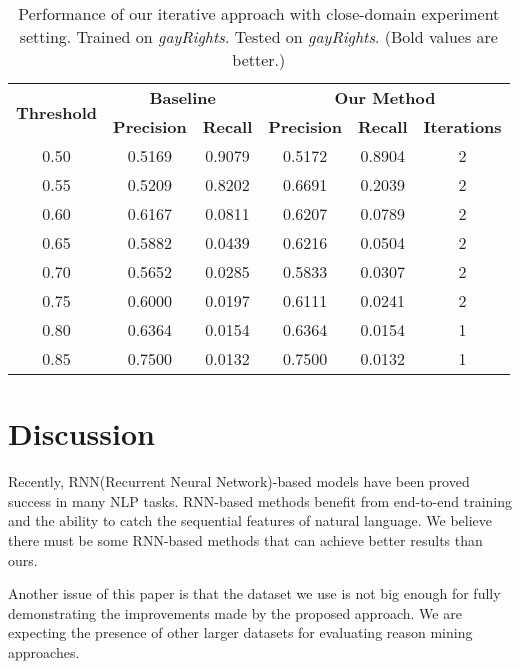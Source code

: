 \documentclass[11pt,a4paper]{article}
\begin{document}
\begin{table*}[h]
\begin{center}
\begin{tabular}{|c||c|c|c|c|c|}
\hline
\multicolumn{1}{|c|}{\multirow{2}{*}{\bf Threshold}} & \multicolumn{2}{c|}{\bf Baseline}  & \multicolumn{3}{c|}{\bf Our Method}    \\ \cline{2-6} 
\multicolumn{1}{|c|}{}   & \multicolumn{1}{l|}{\bf Precision} & \multicolumn{1}{l|}{\bf Recall} & \multicolumn{1}{l|}{\bf Precision} & \multicolumn{1}{c|}{\bf Recall} & \multicolumn{1}{l|}{\bf Iterations} \\ \hline
 \hline
0.50 & 0.5169 & 0.9079 & 0.5172 & 0.8904 & 2 \\
0.55 & 0.5209 & 0.8202 & 0.6691 & 0.2039 & 2 \\
0.60 & 0.6167 & 0.0811 & 0.6207 & 0.0789 & 2 \\
0.65 & 0.5882 & 0.0439 & 0.6216 & 0.0504 & 2 \\
0.70 & 0.5652 & 0.0285 & 0.5833 & 0.0307 & 2 \\
0.75 & 0.6000 & 0.0197 & 0.6111 & 0.0241 & 2 \\
0.80 & 0.6364 & 0.0154 & 0.6364 & 0.0154 & 1 \\
0.85 & 0.7500 & 0.0132 & 0.7500 & 0.0132 & 1
\\\hline
\end{tabular}
\end{center}
\caption{\label{tab:same-topic} Performance of our iterative approach with close-domain experiment setting. Trained on {\it gayRights}. Tested on {\it gayRights}. (Bold values are better.)}
\end{table*}




\section{Discussion}
\label{sec:discussion}

Recently, RNN(Recurrent Neural Network)-based models have been proved success in many NLP tasks\cite{mikolov2010recurrent,luong2015effective}. RNN-based methods benefit from end-to-end training and the ability to catch the sequential features of natural language. We believe there must be some RNN-based methods that can achieve better results than ours. 

Another issue of this paper is that the dataset we use is not big enough for fully demonstrating the improvements made by the proposed approach. We are expecting the presence of other larger datasets for evaluating reason mining approaches.
\end{document}
